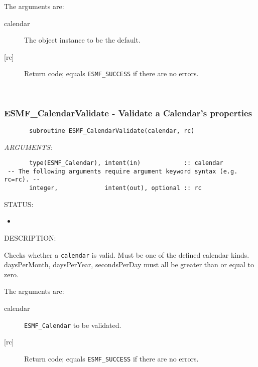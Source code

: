        The arguments are:
       \begin{description}
       \item[calendar]
            The object instance to be the default.
       \item[{[rc]}]
            Return code; equals {\tt ESMF\_SUCCESS} if there are no errors.
       \end{description}
       
 
\mbox{}\hrulefill\ 
 
\subsubsection [ESMF\_CalendarValidate] {ESMF\_CalendarValidate - Validate a Calendar's properties}


 
\begin{verbatim}       subroutine ESMF_CalendarValidate(calendar, rc)
  \end{verbatim}{\em ARGUMENTS:}
\begin{verbatim}       type(ESMF_Calendar), intent(in)            :: calendar
 -- The following arguments require argument keyword syntax (e.g. rc=rc). --
       integer,             intent(out), optional :: rc
 \end{verbatim}
{\sf STATUS:}
   \begin{itemize}
   \item{}
   \end{itemize}
  
{\sf DESCRIPTION:\\ }


       Checks whether a {\tt calendar} is valid.  
       Must be one of the defined calendar kinds.  daysPerMonth, daysPerYear,
       secondsPerDay must all be greater than or equal to zero.
   
       The arguments are:
       \begin{description}
       \item[calendar]
            {\tt ESMF\_Calendar} to be validated.
       \item[{[rc]}]
            Return code; equals {\tt ESMF\_SUCCESS} if there are no errors.
       \end{description}
  
\setlength{\parskip}{\oldparskip}
\setlength{\parindent}{\oldparindent}
\setlength{\baselineskip}{\oldbaselineskip}
